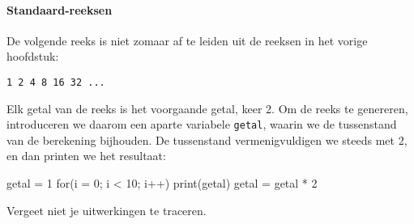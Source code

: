\paragraph{Standaard-reeksen}

De volgende reeks is niet zomaar af te leiden uit de reeksen in het vorige hoofdstuk:

\texttt{1 2 4 8 16 32 ...}



%
%

Elk getal van de reeks is het voorgaande getal, keer 2. Om de reeks te genereren, introduceren we daarom een aparte variabele \texttt{getal}, waarin we de tussenstand van de berekening bijhouden. De tussenstand vermenigvuldigen we steeds met 2, en dan printen we het resultaat:

\begin{nnflisting}
getal = 1
for(i = 0; i < 10; i++)
    print(getal)
    getal = getal * 2
\end{nnflisting}

Vergeet niet je uitwerkingen te traceren.


